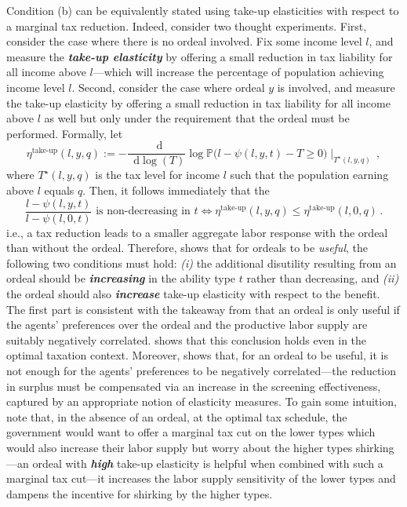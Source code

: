 \documentclass[12pt,letterpaper]{article}
\newenvironment{original}{\color{black}\noindent}{}
\theoremstyle{plain}
\theoremstyle{definition}
\theoremstyle{remark}
\renewcommand{\P}{\mathds{P}}
\renewcommand{\1}{\mathds{1}}
\renewcommand*\d{\mathop{}\!\mathrm{d}}
\theoremstyle{definition}
\begin{document}
\begin{original}
Condition (b) can be equivalently stated using take-up elasticities with respect to a marginal tax reduction. Indeed, consider two thought experiments. First, consider the case where there is no ordeal involved. Fix some income level $l$, and measure the \textit{\textbf{take-up elasticity}} by offering a small reduction in tax liability for all income above $l$---which will increase the percentage of population achieving income level $l$. Second, consider the case where ordeal $y$ is involved, and measure the take-up elasticity by offering a small reduction in tax liability for all income above $l$ as well but only under the requirement that the ordeal must be performed. Formally, let
\[\eta^{\text{take-up}}(l, y, q) := - \frac{\d}{\d  \log(T)} \log \P\Big(l -\psi(l, y, t) - T \geq 0\Big) \mid_{T^\star(l, y, q)} \,,\]
where $T^\star(l, y, q)$ is the tax level for income $l$ such that the population earning above $l$ equals $q$. Then, it follows immediately that the
\[\frac{l - \psi(l, y, t)}{l - \psi(l, 0, t)} \text{ is non-decreasing in $t$} \iff \eta^{\text{take-up}}(l, y, q) \leq \eta^{\text{take-up}}(l, 0, q)\,. \]
i.e., a tax reduction leads to a smaller aggregate labor response with the ordeal than without the ordeal. Therefore,  shows that for ordeals to be \textit{useful}, the following two conditions must hold: \textit{(i)} the additional disutility resulting from an ordeal should be \textit{\textbf{increasing}} in the ability type $t$ rather than decreasing, and \textit{(ii)} the ordeal should also \textit{\textbf{increase}} take-up elasticity with respect to the benefit. The first part is consistent with the takeaway from \citet{yang2022costly} that an ordeal is only useful if the agents' preferences over the ordeal and the productive labor supply are suitably negatively correlated.  shows that this conclusion holds even in the optimal taxation context. Moreover,  shows that, for an ordeal to be useful, it is not enough for the agents' preferences to be negatively correlated---the reduction in surplus must be compensated via an increase in the screening effectiveness, captured by an appropriate notion of elasticity measures. To gain some intuition, note that, in the absence of an ordeal, at the optimal tax schedule, the government would want to offer a marginal tax cut on the lower types which would also increase their labor supply but worry about the higher types shirking---an ordeal with \textit{\textbf{high}} take-up elasticity is helpful when combined with such a marginal tax cut---it increases the labor supply sensitivity of the lower types and dampens the incentive for shirking by the higher types.
\end{original}
\end{document}
